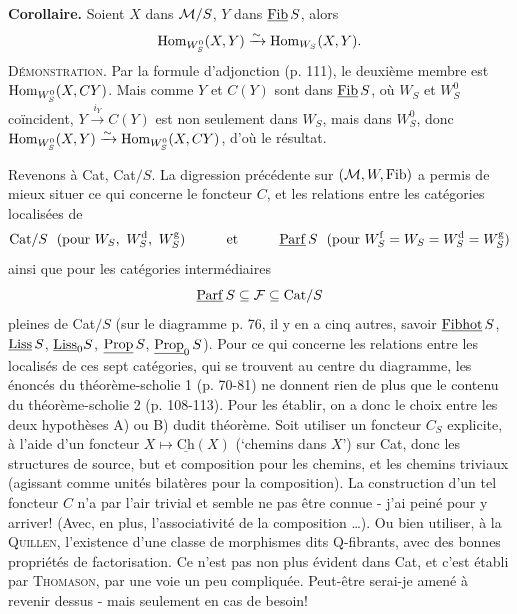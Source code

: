 \textbf{Corollaire.} Soient $X$ dans $\mathcal{M}/S$, $Y$ dans $\underline{\mathrm{Fib}}\, S$, alors
\[\operatorname{Hom}_{W_S^0}(X, Y) \xrightarrow{\sim} \operatorname{Hom}_{W_S}(X, Y).\]
\textsc{Démonstration}. Par la formule d'adjonction (p. 111), le deuxième membre est $\operatorname{Hom}_{W_S^0}(X, CY)$. Mais comme $Y$ et $C(Y)$ sont dans $\underline{\mathrm{Fib}}\, S$, où $W_S$ et $W_S^0$ coïncident, $Y \xrightarrow{i_Y} C(Y)$ est non seulement dans $W_S$, mais dans $W_S^0$, donc $\operatorname{Hom}_{W_S^0}(X, Y) \xrightarrow{\sim} \operatorname{Hom}_{W_S^0}(X, CY)$, d'où le résultat.

Revenons à Cat, Cat$/S$. La digression précédente sur $(\mathcal{M}, W, \mathrm{Fib})$ a permis de mieux situer ce qui concerne le foncteur $C$, et les relations entre les catégories localisées de
\[\Cat/S \ \ (\text{pour } W_S,\ W_S^{\mathrm{d}},\ W_S^{\mathrm{g}}) \qquad\quad \text{et} \qquad\quad \Parf S \ \ (\text{pour } W_S^{\mathrm{f}} = W_S = W_S^{\mathrm{d}} = W_S^{\mathrm{g}})\]
ainsi que pour les catégories intermédiaires
\[\underline{\mathrm{Parf}}\, S \subseteq \mathcal{F} \subseteq \mathrm{Cat}/S\]
pleines de Cat$/S$ (sur le diagramme p. 76, il y en a cinq autres, savoir $\underline{\mathrm{Fibhot}}\, S$, $\underline{\mathrm{Liss}}\,S$, $\underline{\mathrm{Liss}}_0 S$, $\underline{\mathrm{Prop}}\,S$, $\underline{\mathrm{Prop}}_0\,S$). Pour ce qui concerne les relations entre les localisés de ces sept catégories, qui se trouvent au centre du diagramme, les énoncés du théorème-scholie 1 (p. 70-81) ne donnent rien de plus que le contenu du théorème-scholie 2 (p. 108-113). Pour les établir, on a donc le choix entre les deux hypothèses A) ou B) dudit théorème. Soit utiliser un foncteur $C_S$ explicite, à l'aide d'un
foncteur $X \longmapsto \underline{\mathrm{Ch}}(X)$ (‘chemins dans $X$’) sur Cat, donc les structures de source, but et composition pour les chemins, et les chemins triviaux (agissant comme unités bilatères pour la composition). La construction d'un tel foncteur $C$ n'a par l'air trivial et semble ne pas être connue - j'ai peiné pour y arriver! (Avec, en plus, l'associativité de la composition \ldots). Ou bien utiliser, à la \textsc{Quillen}, l'existence d'une classe de morphismes dits Q-fibrants, avec des bonnes propriétés de factorisation. Ce n'est pas non plus évident dans Cat, et c'est établi par \textsc{Thomason}, par une voie un peu compliquée. Peut-être serai-je amené à revenir dessus - mais seulement en cas de besoin! %

